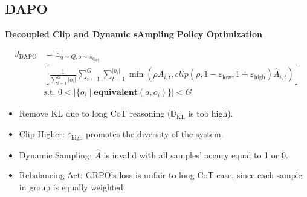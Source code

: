 \subsection{DAPO}
\begin{frame}
    \textbf{Decoupled Clip and Dynamic sAmpling Policy Optimization}
    \begin{tiny}
        \begin{align*}
            J_{\text{DAPO}} &=\mathbb{E}_{q\sim Q, o \sim \pi_{\theta_{\text{old}}}} \\
            &\left[
                \frac{1}{\sum_{i=1}^{G}|o_i|} \sum_{i=1}^{G}\sum_{t=1}^{|o_i|}
                \min \left(
                    \rho \hat{A}_{i,t}, clip(\rho, 1-\varepsilon_{\text{low}}, 1+\varepsilon_{\text{high}})\hat{A}_{i, t}
                \right)
            \right]\\
            &\text{s.t. } 0 < \left|
                \{
                    o_i \; | \; \textbf{equivalent}(a, o_i)
                \}
            \right| < G
        \end{align*}
    \end{tiny}
    \begin{itemize}
        \item Remove KL due to long CoT reasoning ($\mathbb{D}_{\text{KL}}$ is too high).
        \item Clip-Higher: $\varepsilon_{\text{high}}$ promotes the diversity of the system.
        \item Dynamic Sampling: $\hat{A}$ is invalid with all samples' accury equal to 1 or 0.
        \item Rebalancing Act: GRPO's loss is unfair to long CoT case, since each sample in group is equally weighted.
    \end{itemize}
\end{frame}

